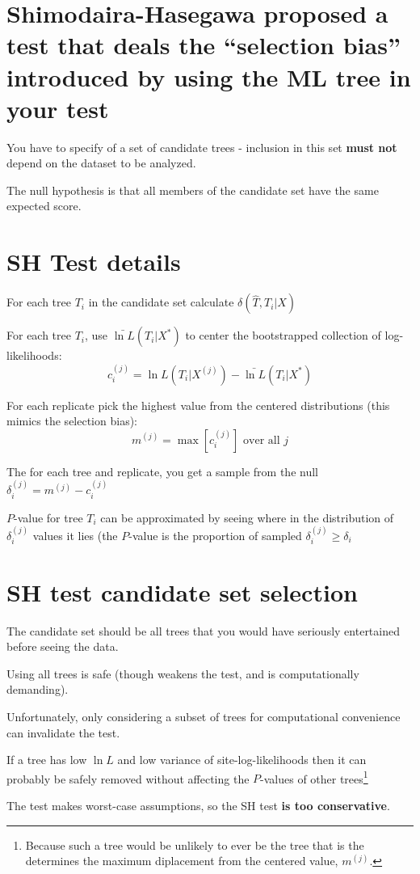 \documentclass[landscape]{foils}
\begin{document}
\myNewSlide 
\section*{Shimodaira-Hasegawa proposed a test that deals the ``selection bias'' introduced by using the ML tree in your test}
You have to specify of a set of candidate trees - inclusion in this set {\bf must not} depend on the dataset to be analyzed.

The null hypothesis is that all members of the candidate set have the same expected score.

\myNewSlide
\section*{SH Test details}
\normalsize
\begin{compactitem}
	\item For each tree $T_i$ in the candidate set calculate $\delta(\hat{T}, T_i|X)$
	\item For each tree $T_i$, use $\bar{\ln L}(T_i|X^{\ast})$ to center the bootstrapped collection of log-likelihoods:
		$$c_i^{(j)} = {\ln L}(T_i|X^{(j)})-\bar{\ln L}(T_i|X^{\ast})$$
	\item For each replicate pick the highest value from the centered distributions (this mimics the selection bias): $$m^{(j)} = \max\left[c_i^{(j)}\right] \mbox{ over all } j$$
	\item The for each tree and replicate, you get a sample from the null $\delta_i^{(j)} = m^{(j)} - c_i^{(j)}$
	\item $P$-value for tree $T_i$ can be approximated by seeing where in the distribution of $\delta_i^{(j)}$ values it lies (the $P$-value is the proportion of sampled $\delta_i^{(j)} \geq \delta_i$
\end{compactitem}

\myNewSlide
\section*{SH test candidate set selection}
\large
\begin{compactitem}
	\item The candidate set should be all trees that you would have seriously entertained before seeing the data. 
	\item Using all trees is safe (though weakens the test, and is computationally demanding).
	\item Unfortunately, only considering a subset of trees for computational convenience can invalidate the test.
	\item If a tree has low $\ln L$ and low variance of site-log-likelihoods then it can probably be safely removed without affecting the $P$-values of other trees\footnote{Because such a tree would be unlikely to ever be the tree that is the determines the maximum diplacement from the centered value, $m^{(j)}$.}
\end{compactitem}
The test makes worst-case assumptions, so the SH test {\bf is too conservative}.
\end{document}
